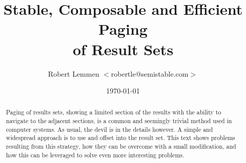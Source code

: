 \documentclass[11pt,a4paper]{article}
\title{Stable, Composable and Efficient Paging\\ of Result Sets}
\author{Robert Lemmen $<$robertle@semistable.com$>$}
\date{\today}
\begin{document}
\maketitle
\bigskip

\begin{abstract}
\noindent Paging of results sets, showing a limited section of the results with
the ability to navigate to the adjacent sections, is a common and seemingly
trivial method used in computer systems. As usual, the devil is in the details
however. A simple and widespread approach is to use and offset into the result
set. This text shows problems resulting from this strategy, how they can be
overcome with a small modification, and how this can be leveraged to solve
even more interesting problems.
\end{abstract}
\vspace{40pt}
\end{document}
